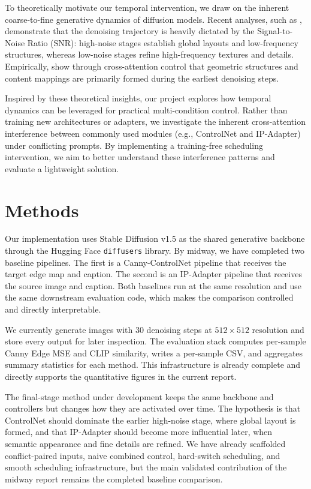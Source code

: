 \documentclass[twocolumn,11pt]{article}
\begin{document}
To theoretically motivate our temporal intervention, we draw on the inherent coarse-to-fine generative dynamics of diffusion models. Recent analyses, such as \citet{rethinking2024snr}, demonstrate that the denoising trajectory is heavily dictated by the Signal-to-Noise Ratio (SNR): high-noise stages establish global layouts and low-frequency structures, whereas low-noise stages refine high-frequency textures and details. Empirically, \citet{hertz2022prompt} show through cross-attention control that geometric structures and content mappings are primarily formed during the earliest denoising steps. 

Inspired by these theoretical insights, our project explores how temporal dynamics can be leveraged for practical multi-condition control. Rather than training new architectures or adapters, we investigate the inherent cross-attention interference between commonly used modules (e.g., ControlNet and IP-Adapter) \citep{zhang2023controlnet, ye2023ipadapter} under conflicting prompts. By implementing a training-free scheduling intervention, we aim to better understand these interference patterns and evaluate a lightweight solution. 


\section{Methods}
Our implementation uses Stable Diffusion v1.5 as the shared generative backbone through the Hugging Face \texttt{diffusers} library. By midway, we have completed two baseline pipelines. The first is a Canny-ControlNet pipeline that receives the target edge map and caption. The second is an IP-Adapter pipeline that receives the source image and caption. Both baselines run at the same resolution and use the same downstream evaluation code, which makes the comparison controlled and directly interpretable.

We currently generate images with 30 denoising steps at $512 \times 512$ resolution and store every output for later inspection. The evaluation stack computes per-sample Canny Edge MSE and CLIP similarity, writes a per-sample CSV, and aggregates summary statistics for each method. This infrastructure is already complete and directly supports the quantitative figures in the current report.

The final-stage method under development keeps the same backbone and controllers but changes how they are activated over time. The hypothesis is that ControlNet should dominate the earlier high-noise stage, where global layout is formed, and that IP-Adapter should become more influential later, when semantic appearance and fine details are refined. We have already scaffolded conflict-paired inputs, naive combined control, hard-switch scheduling, and smooth scheduling infrastructure, but the main validated contribution of the midway report remains the completed baseline comparison.
\end{document}
